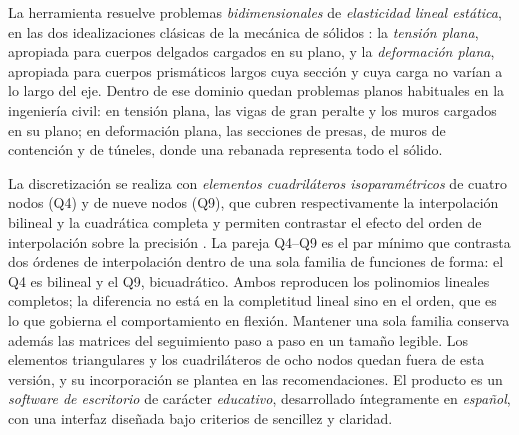 La herramienta resuelve problemas \emph{bidimensionales} de \emph{elasticidad lineal estática}, en las dos idealizaciones clásicas de la mecánica de sólidos \autocite[p.~11]{timoshenko1970elasticity}: la \emph{tensión plana}, apropiada para cuerpos delgados cargados en su plano, y la \emph{deformación plana}, apropiada para cuerpos prismáticos largos cuya sección y cuya carga no varían a lo largo del eje. Dentro de ese dominio quedan problemas planos habituales en la ingeniería civil: en tensión plana, las vigas de gran peralte y los muros cargados en su plano; en deformación plana, las secciones de presas, de muros de contención y de túneles, donde una rebanada representa todo el sólido.

La discretización se realiza con \emph{elementos cuadriláteros isoparamétricos} de cuatro nodos (Q4) y de nueve nodos (Q9), que cubren respectivamente la interpolación bilineal y la cuadrática completa y permiten contrastar el efecto del orden de interpolación sobre la precisión \autocites[pp.~137-138]{hughes2000fem}[pp.~164, 183-184]{onate2009structural}. La pareja Q4--Q9 es el par mínimo que contrasta dos órdenes de interpolación dentro de una sola familia de funciones de forma: el Q4 es bilineal y el Q9, bicuadrático. Ambos reproducen los polinomios lineales completos; la diferencia no está en la completitud lineal sino en el orden, que es lo que gobierna el comportamiento en flexión. Mantener una sola familia conserva además las matrices del seguimiento paso a paso en un tamaño legible. Los elementos triangulares y los cuadriláteros de ocho nodos quedan fuera de esta versión, y su incorporación se plantea en las recomendaciones. El producto es un \emph{software de escritorio} de carácter \emph{educativo}, desarrollado íntegramente en \emph{español}, con una interfaz diseñada bajo criterios de sencillez y claridad.

